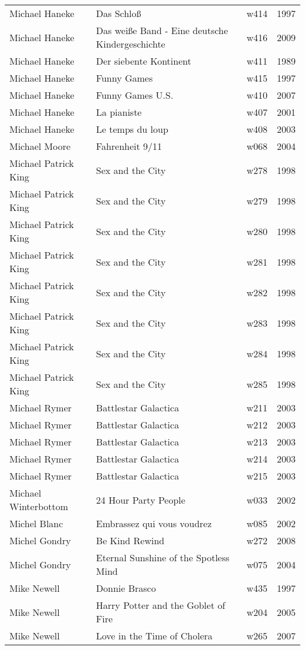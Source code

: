 \documentclass{article}
\begin{document}
\begin {center}
\begin{longtable}{l p{10cm} l l}
Michael Haneke & Das Schloß & w414 & 1997 \\
Michael Haneke & Das weiße Band - Eine deutsche Kindergeschichte & w416 & 2009 \\
Michael Haneke & Der siebente Kontinent & w411 & 1989 \\
Michael Haneke & Funny Games & w415 & 1997 \\
Michael Haneke & Funny Games U.S. & w410 & 2007 \\
Michael Haneke & La pianiste & w407 & 2001 \\
Michael Haneke & Le temps du loup & w408 & 2003 \\
Michael Moore & Fahrenheit 9/11 & w068 & 2004 \\
Michael Patrick King & Sex and the City & w278 & 1998 \\
Michael Patrick King & Sex and the City & w279 & 1998 \\
Michael Patrick King & Sex and the City & w280 & 1998 \\
Michael Patrick King & Sex and the City & w281 & 1998 \\
Michael Patrick King & Sex and the City & w282 & 1998 \\
Michael Patrick King & Sex and the City & w283 & 1998 \\
Michael Patrick King & Sex and the City & w284 & 1998 \\
Michael Patrick King & Sex and the City & w285 & 1998 \\
Michael Rymer & Battlestar Galactica & w211 & 2003 \\
Michael Rymer & Battlestar Galactica & w212 & 2003 \\
Michael Rymer & Battlestar Galactica & w213 & 2003 \\
Michael Rymer & Battlestar Galactica & w214 & 2003 \\
Michael Rymer & Battlestar Galactica & w215 & 2003 \\
Michael Winterbottom & 24 Hour Party People & w033 & 2002 \\
Michel Blanc & Embrassez qui vous voudrez & w085 & 2002 \\
Michel Gondry & Be Kind Rewind & w272 & 2008 \\
Michel Gondry & Eternal Sunshine of the Spotless Mind & w075 & 2004 \\
Mike Newell & Donnie Brasco & w435 & 1997 \\
Mike Newell & Harry Potter and the Goblet of Fire & w204 & 2005 \\
Mike Newell & Love in the Time of Cholera & w265 & 2007 \\

\end{longtable}
\end{center}
\end{document}
